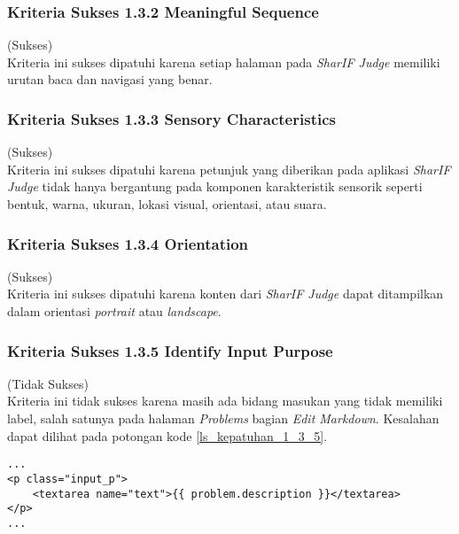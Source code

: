 \subsubsection{Kriteria Sukses 1.3.2 Meaningful Sequence}
\label{subsubsec:kepatuhan_kriteria_1.3.2}
(Sukses) \\

Kriteria ini sukses dipatuhi karena setiap halaman pada \textit{SharIF Judge} memiliki urutan baca dan navigasi yang benar.

\subsubsection{Kriteria Sukses 1.3.3 Sensory Characteristics}
\label{subsubsec:kepatuhan_kriteria_1.3.3}
(Sukses)\\

Kriteria ini sukses dipatuhi karena petunjuk yang diberikan pada aplikasi \textit{SharIF Judge} tidak hanya bergantung pada komponen karakteristik sensorik seperti bentuk, warna, ukuran, lokasi visual, orientasi, atau suara.

\subsubsection{Kriteria Sukses 1.3.4 Orientation}
\label{subsubsec:kepatuhan_kriteria_1.3.4}
(Sukses) \\

Kriteria ini sukses dipatuhi karena konten dari \textit{SharIF Judge} dapat ditampilkan dalam orientasi \textit{portrait} atau \textit{landscape}.

\subsubsection{Kriteria Sukses 1.3.5 Identify Input Purpose}
\label{subsubsec:kepatuhan_kriteria_1.3.5}
(Tidak Sukses)\\

Kriteria ini tidak sukses karena masih ada bidang masukan yang tidak memiliki label, salah satunya pada halaman \textit{Problems} bagian \textit{Edit Markdown}. Kesalahan dapat dilihat pada potongan kode \ref{ls_kepatuhan_1_3_5}.
\begin{lstlisting}[basicstyle=\ttfamily, frame=single,
columns=fullflexible, keepspaces=true, breaklines=true, label=ls_kepatuhan_1_3_5, caption=Kriteria Sukses 1.3.5 - Elemen Tidak Diberi Label Pada Halaman \textit{Problems} Bagian \textit{Edit Markdown}]
...
<p class="input_p">
	<textarea name="text">{{ problem.description }}</textarea>
</p>
...
\end{lstlisting}

